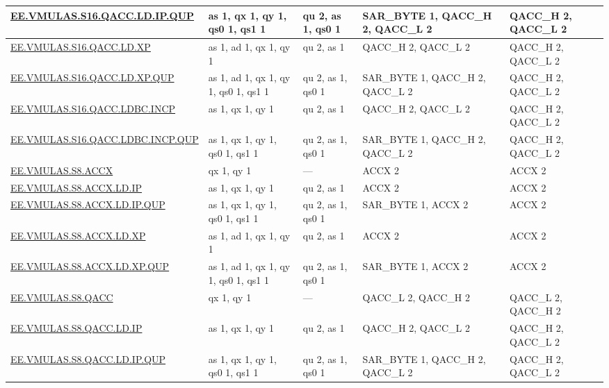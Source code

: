 \begin{longtable}[c]{|l|m{2.5cm}|m{2.5cm}|m{2.5cm}|m{2.5cm}|}
    \hyperref[instruction:EEVMULASS16QACCLDIPQUP]{EE.VMULAS.S16.QACC.LD.IP.QUP} & as 1, qx 1, qy 1, qs0 1, qs1 1 & qu 2, as 1, qs0 1 & SAR\_BYTE 1, QACC\_H 2, QACC\_L 2 & QACC\_H 2, QACC\_L 2\\\hline
    \hyperref[instruction:EEVMULASS16QACCLDXP]{EE.VMULAS.S16.QACC.LD.XP} & as 1, ad 1, qx 1, qy 1 & qu 2, as 1 & QACC\_H 2, QACC\_L 2 & QACC\_H 2, QACC\_L 2\\\hline
    \hyperref[instruction:EEVMULASS16QACCLDXPQUP]{EE.VMULAS.S16.QACC.LD.XP.QUP} & as 1, ad 1, qx 1, qy 1, qs0 1, qs1 1 & qu 2, as 1, qs0 1 & SAR\_BYTE 1, QACC\_H 2, QACC\_L 2 & QACC\_H 2, QACC\_L 2\\\hline
    \hyperref[instruction:EEVMULASS16QACCLDBCINCP]{EE.VMULAS.S16.QACC.LDBC.INCP} & as 1, qx 1, qy 1 & qu 2, as 1 & QACC\_H 2, QACC\_L 2 & QACC\_H 2, QACC\_L 2\\\hline
    \hyperref[instruction:EEVMULASS16QACCLDBCINCPQUP]{EE.VMULAS.S16.QACC.LDBC.INCP.QUP} & as 1, qx 1, qy 1, qs0 1, qs1 1 & qu 2, as 1, qs0 1 & SAR\_BYTE 1, QACC\_H 2, QACC\_L 2 & QACC\_H 2, QACC\_L 2\\\hline
    \hyperref[instruction:EEVMULASS8ACCX]{EE.VMULAS.S8.ACCX} & qx 1, qy 1 & — & ACCX 2 & ACCX 2\\\hline
    \hyperref[instruction:EEVMULASS8ACCXLDIP]{EE.VMULAS.S8.ACCX.LD.IP} & as 1, qx 1, qy 1 & qu 2, as 1 & ACCX 2 & ACCX 2\\\hline
    \hyperref[instruction:EEVMULASS8ACCXLDIPQUP]{EE.VMULAS.S8.ACCX.LD.IP.QUP} & as 1, qx 1, qy 1, qs0 1, qs1 1 & qu 2, as 1, qs0 1 & SAR\_BYTE 1, ACCX 2 & ACCX 2\\\hline
    \hyperref[instruction:EEVMULASS8ACCXLDXP]{EE.VMULAS.S8.ACCX.LD.XP} & as 1, ad 1, qx 1, qy 1 & qu 2, as 1 & ACCX 2 & ACCX 2\\\hline
    \hyperref[instruction:EEVMULASS8ACCXLDXPQUP]{EE.VMULAS.S8.ACCX.LD.XP.QUP} & as 1, ad 1, qx 1, qy 1, qs0 1, qs1 1 & qu 2, as 1, qs0 1 & SAR\_BYTE 1, ACCX 2 & ACCX 2\\\hline
    \hyperref[instruction:EEVMULASS8QACC]{EE.VMULAS.S8.QACC} & qx 1, qy 1 & — & QACC\_L 2, QACC\_H 2 & QACC\_L 2, QACC\_H 2\\\hline
    \hyperref[instruction:EEVMULASS8QACCLDIP]{EE.VMULAS.S8.QACC.LD.IP} & as 1, qx 1, qy 1 & qu 2, as 1 & QACC\_H 2, QACC\_L 2 & QACC\_H 2, QACC\_L 2\\\hline
    \hyperref[instruction:EEVMULASS8QACCLDIPQUP]{EE.VMULAS.S8.QACC.LD.IP.QUP} & as 1, qx 1, qy 1, qs0 1, qs1 1 & qu 2, as 1, qs0 1 & SAR\_BYTE 1, QACC\_H 2, QACC\_L 2 & QACC\_H 2, QACC\_L 2\\\hline

\end{longtable}
